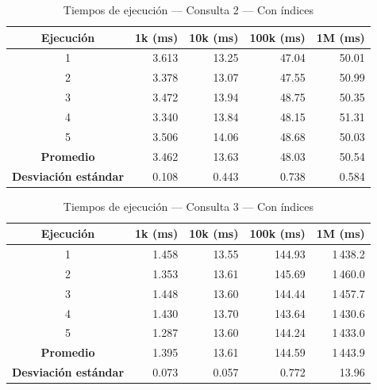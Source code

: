 \begin{table}[H]
\centering
\small
\caption{Tiempos de ejecución --- Consulta 2 --- Con índices}
\begin{tabular}{|c|r|r|r|r|}
\hline
\textbf{Ejecución} & \textbf{1k (ms)} & \textbf{10k (ms)} & \textbf{100k (ms)} & \textbf{1M (ms)} \\ \hline
1 & 3.613 & 13.25 & 47.04 & 50.01 \\ \hline
2 & 3.378 & 13.07 & 47.55 & 50.99 \\ \hline
3 & 3.472 & 13.94 & 48.75 & 50.35 \\ \hline
4 & 3.340 & 13.84 & 48.15 & 51.31 \\ \hline
5 & 3.506 & 14.06 & 48.68 & 50.03 \\ \hline
\textbf{Promedio} & 3.462 & 13.63 & 48.03 & 50.54 \\ \hline
\textbf{Desviación estándar} & 0.108 & 0.443 & 0.738 & 0.584 \\ \hline
\end{tabular}

\end{table}

\begin{table}[H]
\centering
\small
\caption{Tiempos de ejecución --- Consulta 3 --- Con índices}
\begin{tabular}{|c|r|r|r|r|}
\hline
\textbf{Ejecución} & \textbf{1k (ms)} & \textbf{10k (ms)} & \textbf{100k (ms)} & \textbf{1M (ms)} \\ \hline
1 & 1.458 & 13.55 & 144.93 & 1\,438.2 \\ \hline
2 & 1.353 & 13.61 & 145.69 & 1\,460.0 \\ \hline
3 & 1.448 & 13.60 & 144.44 & 1\,457.7 \\ \hline
4 & 1.430 & 13.70 & 143.64 & 1\,430.6 \\ \hline
5 & 1.287 & 13.60 & 144.24 & 1\,433.0 \\ \hline
\textbf{Promedio} & 1.395 & 13.61 & 144.59 & 1\,443.9 \\ \hline
\textbf{Desviación estándar} & 0.073 & 0.057 & 0.772 & 13.96 \\ \hline
\end{tabular}

\end{table}


